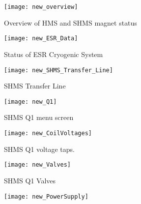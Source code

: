 {%

\begin{figure}
\begin{center}
\texttt{[image: new\_overview]}
\caption{\label{fig:magc_overview}Overview of HMS and SHMS magnet status}
\end{center}
\end{figure}

\begin{figure}
\begin{center}
\texttt{[image: new\_ESR\_Data]}
\caption{\label{fig:magc_ESR_Data}Status of ESR Cryogenic System}
\end{center}
\end{figure}

\begin{figure}
\begin{center}
\texttt{[image: new\_SHMS\_Transfer\_Line]}
\caption{\label{fig:magc_SHMS_Transfer_Line}SHMS Transfer Line}
\end{center}
\end{figure}

\begin{figure}
\begin{center}
\texttt{[image: new\_Q1]}
\caption{\label{fig:magc_q1}SHMS Q1 menu screen}
\end{center}
\end{figure}

\begin{figure}
\begin{center}
\texttt{[image: new\_CoilVoltages]}
\caption{\label{fig:magc_coilvoltages}SHMS Q1 voltage taps.}
\end{center}
\end{figure}

\begin{figure}
\begin{center}
\texttt{[image: new\_Valves]}
\caption{\label{fig:magc_valves}SHMS Q1 Valves}
\end{center}
\end{figure}

\begin{figure}
\begin{center}
\texttt{[image: new\_PowerSupply]}
\caption{\label{fig:magc_PowerSupply}}
\end{center}
\end{figure}

}

